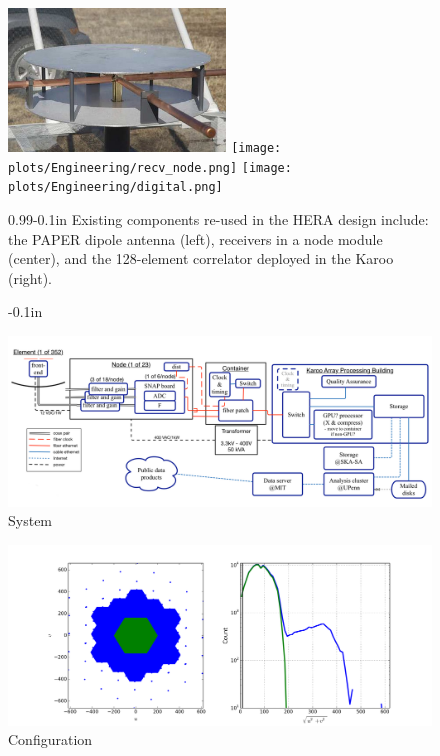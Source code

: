 \documentclass[ars]{copernicus}
\begin{document}
\begin{figure}[t]
    \centering
        \includegraphics[height=1.5in]{plots/new_antenna_closeup.jpg}
        \texttt{[image: plots/Engineering/recv\_node.png]}
        \texttt{[image: plots/Engineering/digital.png]}
    \caption{-0.1in}{0.99}{-0.1in}{\small
    Existing components re-used in the HERA design include:
    the PAPER dipole antenna (left), 
    receivers in a node module (center), and
    the 128-element correlator deployed in the Karoo (right).
}\label{fig:components}
\end{figure}


\begin{figure}[t]
\vspace*{2mm}
\begin{center}
\includegraphics[width=12cm]{plots/HERA_high_level_block_diagram.png}
\end{center}
\caption{System  \label{fig:systemOverview}}
\end{figure}

\begin{figure}[t]
\vspace*{2mm}
\begin{center}
\includegraphics[width=12cm]{plots/config.png}
\end{center}
\caption{Configuration  \label{fig:config}}
\end{figure}
\end{document}
